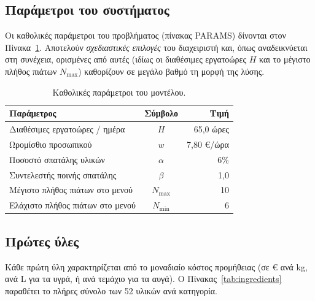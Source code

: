 \documentclass[11pt,a4paper]{article}
\newcommand{\en}[1]{\textenglish{#1}}
\begin{document}
\subsection{Παράμετροι του συστήματος}
Οι καθολικές παράμετροι του προβλήματος (πίνακας \en{PARAMS}) δίνονται στον
Πίνακα~\ref{tab:params}. Αποτελούν \emph{σχεδιαστικές επιλογές} του διαχειριστή
και, όπως αναδεικνύεται στη συνέχεια, ορισμένες από αυτές (ιδίως οι διαθέσιμες
εργατοώρες $H$ και το μέγιστο πλήθος πιάτων $N_{\max}$) καθορίζουν σε μεγάλο βαθμό
τη μορφή της λύσης.

\begin{table}[htbp]
\centering
\caption{Καθολικές παράμετροι του μοντέλου.}
\label{tab:params}
\small
\begin{tabular}{@{}lcr@{}}
\toprule
\textbf{Παράμετρος} & \textbf{Σύμβολο} & \textbf{Τιμή}\\
\midrule
Διαθέσιμες εργατοώρες / ημέρα & $H$ & 65,0 ώρες\\
Ωρομίσθιο προσωπικού & $w$ & 7,80 €/ώρα\\
Ποσοστό σπατάλης υλικών & $\alpha$ & 6\%\\
Συντελεστής ποινής σπατάλης & $\beta$ & 1,0\\
Μέγιστο πλήθος πιάτων στο μενού & $N_{\max}$ & 10\\
Ελάχιστο πλήθος πιάτων στο μενού & $N_{\min}$ & 6\\
\bottomrule
\end{tabular}
\end{table}

\subsection{Πρώτες ύλες}
Κάθε πρώτη ύλη χαρακτηρίζεται από το μοναδιαίο κόστος προμήθειας (σε € ανά kg, ανά
L για τα υγρά, ή ανά τεμάχιο για τα αυγά). Ο Πίνακας~\ref{tab:ingredients}
παραθέτει το πλήρες σύνολο των 52 υλικών ανά κατηγορία.

\begin{table}[htbp]
\centering
\caption{Πρώτες ύλες — μοναδιαίο κόστος προμήθειας (μέσες τιμές 2026).}
\label{tab:ingredients}
\footnotesize
\begin{minipage}[t]{0.49\textwidth}\centering

\end{minipage}\hfill
\begin{minipage}[t]{0.49\textwidth}\centering

\end{minipage}
\end{table}
\end{document}
